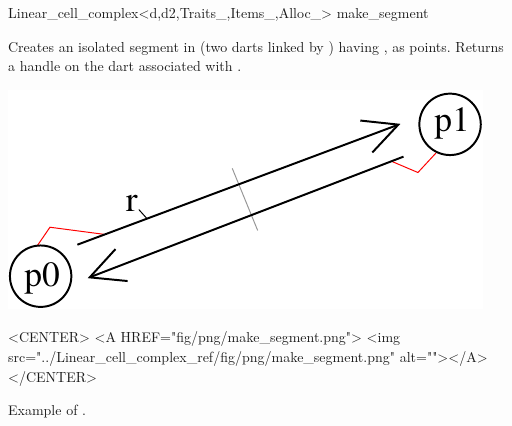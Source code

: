 \begin{ccRefClass}{Linear_cell_complex<d,d2,Traits_,Items_,Alloc_>}
{make_segment}{}

{Creates an isolated segment in  (two darts linked by \betadeux{}) 
  having ,  as points.
  Returns a handle on the dart associated with .
}
% 
\def\LargFig{.3\textwidth}
\begin{ccTexOnly}
  \begin{center}
    \includegraphics[width=\LargFig]{Linear_cell_complex_ref/fig/pdf/make_segment}
  \end{center}
\end{ccTexOnly}
\begin{ccHtmlOnly}
  <CENTER>
  <A HREF="fig/png/make_segment.png">
  <img src="../Linear_cell_complex_ref/fig/png/make_segment.png" alt=""></A>
  </CENTER>
\end{ccHtmlOnly}
\centerline{Example of .}


\end{ccRefClass}
